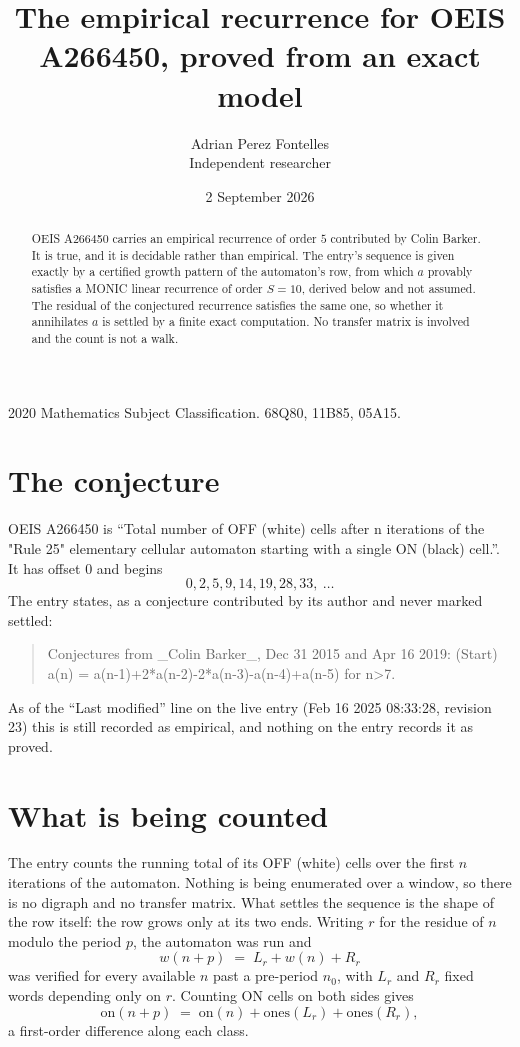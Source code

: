 \documentclass[11pt,a4paper]{article}
\title{The empirical recurrence for OEIS A266450, proved from an exact model}
\author{Adrian Perez Fontelles\\ \small Independent researcher}
\date{2 September 2026}
\theoremstyle{plain}
\theoremstyle{definition}
\begin{document}
\maketitle

\begin{abstract}
OEIS A266450 carries an empirical recurrence of order $5$ contributed by Colin Barker. It is true, and it is
decidable rather than empirical. The entry's sequence is given exactly by a certified growth pattern of the automaton's row, from
which $a$ provably satisfies a MONIC linear recurrence of order $S=10$, derived below and not
assumed. The residual of the conjectured recurrence satisfies the same one, so whether it
annihilates $a$ is settled by a finite exact computation. No transfer matrix is involved and
the count is not a walk.
\end{abstract}

\noindent\small 2020 Mathematics Subject Classification. 68Q80, 11B85, 05A15.\normalsize

\section{The conjecture}

OEIS A266450 is ``Total number of OFF (white) cells after n iterations of the "Rule 25" elementary cellular automaton starting with a single ON (black) cell.''. It has offset $0$ and begins
\[
0, 2, 5, 9, 14, 19, 28, 33,\ \dots
\]
The entry states, as a conjecture contributed by its author and never marked settled:
\begin{quote}
Conjectures from \_Colin Barker\_, Dec 31 2015 and Apr 16 2019: (Start) a(n) = a(n-1)+2*a(n-2)-2*a(n-3)-a(n-4)+a(n-5) for n>7.
\end{quote}
As of the ``Last modified'' line on the live entry (Feb 16 2025 08:33:28, revision 23)
this is still recorded as empirical, and nothing on the entry records it as proved.

\section{What is being counted}

The entry counts the running total of its OFF (white) cells over the first $n$ iterations of the automaton. Nothing is being enumerated over a window, so there is
no digraph and no transfer matrix. What settles the sequence is the shape of the row itself:
the row grows only at its two ends. Writing
$r$ for the residue of $n$ modulo the period $p$, the automaton was run and
\[
w(n+p)\;=\;L_r + w(n) + R_r
\]
was verified for every available $n$ past a
pre-period $n_0$, with $L_r$ and $R_r$ fixed words depending only on $r$. Counting ON cells on
both sides gives
\[
\mathrm{on}(n+p)\;=\;\mathrm{on}(n)+\mathrm{ones}(L_r)+\mathrm{ones}(R_r),
\]
a first-order difference along each class.
\end{document}
